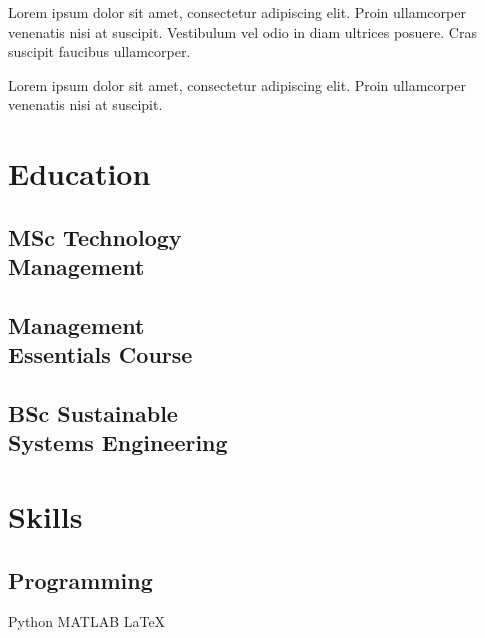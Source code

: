 \documentclass[]{plushcv}
\begin{document}
\begin{minipage}[t]{0.70\textwidth}
	\begin{tightemize}
	\item Lorem ipsum dolor sit amet, consectetur adipiscing elit. Proin ullamcorper venenatis nisi at suscipit. Vestibulum vel odio in diam ultrices posuere. Cras suscipit faucibus ullamcorper. 
	\item Lorem ipsum dolor sit amet, consectetur adipiscing elit. Proin ullamcorper venenatis nisi at suscipit.
	\end{tightemize}
	\sectionsep




\end{minipage} \hfill
\begin{minipage}[t]{0.25\textwidth} 


\section{Education} 
	\subsection{MSc Technology\\ Management}
	\sectionsep
	
	\subsection{Management\\ Essentials Course}
	\sectionsep

	\subsection{BSc Sustainable\\Systems Engineering}
	\sectionsep


\section{Skills}
	\subsection{Programming}
	Python  \tb MATLAB \tb \LaTeX
	\subskip
	

\end{minipage}
\end{document}

